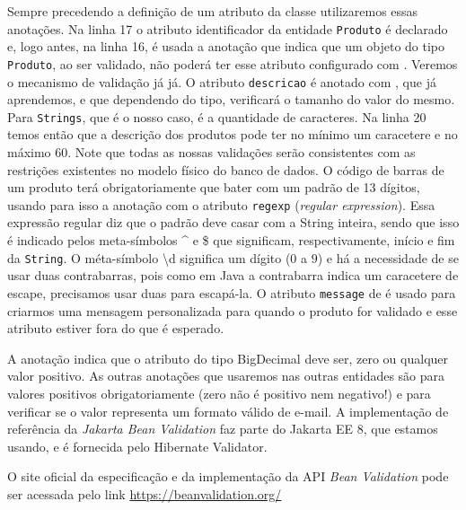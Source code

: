 Sempre precedendo a definição de um atributo da classe utilizaremos essas anotações. Na linha 17 o atributo identificador da entidade \texttt{Produto} é declarado e, logo antes, na linha 16, é usada a anotação  que indica que um objeto do tipo \texttt{Produto}, ao ser validado, não poderá ter esse atributo configurado com . Veremos o mecanismo de validação já já. O atributo \texttt{descricao} é anotado com , que já aprendemos, e  que dependendo do tipo, verificará o tamanho do valor do mesmo. Para \texttt{Strings}, que é o nosso caso, é a quantidade de caracteres. Na linha 20 temos então que a descrição dos produtos pode ter no mínimo um caracetere e no máximo 60. Note que todas as nossas validações serão consistentes com as restrições existentes no modelo físico do banco de dados. O código de barras de um produto terá obrigatoriamente que bater com um padrão de 13 dígitos, usando para isso a anotação  com o atributo \texttt{regexp} (\textit{regular expression}). Essa expressão regular diz que o padrão deve casar com a String inteira, sendo que isso é indicado pelos meta-símbolos \^{} e \$ que significam, respectivamente, início e fim da \texttt{String}. O méta-símbolo \textbackslash{}d significa um dígito ($0$ a $9$) e há a necessidade de se usar duas contrabarras, pois como em Java a contrabarra indica um caracetere de escape, precisamos usar duas para escapá-la. O atributo \texttt{message} de  é usado para criarmos uma mensagem personalizada para quando o produto for validado e esse atributo estiver fora do que é esperado.

A anotação  indica que o atributo do tipo BigDecimal deve ser, zero ou qualquer valor positivo. As outras anotações que usaremos nas outras entidades são  para valores positivos obrigatoriamente (zero não é positivo nem negativo!) e  para verificar se o valor representa um formato válido de e-mail. A implementação de referência da \textit{Jakarta Bean Validation} faz parte do Jakarta EE 8, que estamos usando, e é fornecida pelo Hibernate Validator.

\begin{saibaMais}
    O site oficial da especificação e da implementação da API \textit{Bean Validation} pode ser acessada pelo link \url{https://beanvalidation.org/}
\end{saibaMais}

